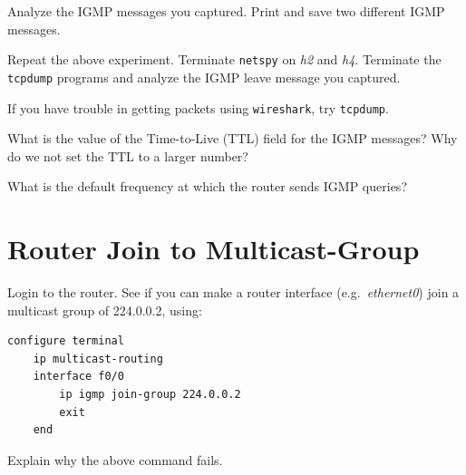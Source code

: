 \documentclass{../UTNetLab}
\begin{document}
    Analyze the IGMP messages you captured.
    Print and save two different IGMP messages.

    Repeat the above experiment.
    Terminate \lstinline{netspy} on \textit{h2} and \textit{h4}.
    Terminate the \lstinline{tcpdump} programs and analyze the IGMP leave message you captured.

    If you have trouble in getting packets using \lstinline{wireshark}, try \lstinline{tcpdump}.
    
    \begin{report}
    \item What is the value of the Time-to-Live (TTL) field for the IGMP messages?
    Why do we not set the TTL to a larger number?

    \item What is the default frequency at which the router sends IGMP queries?
    \end{report}

\section{Router Join to Multicast-Group}
    Login to the router.
    See if you can make a router interface (e.g.\ \textit{ethernet0}) join a multicast group of 224.0.0.2, using:
    \begin{lstlisting}[language={cisco}]
configure terminal
    ip multicast-routing
    interface f0/0
        ip igmp join-group 224.0.0.2
        exit
    end
    \end{lstlisting}
    
    \begin{report}
    \item Explain why the above command fails.
    \end{report}
\end{document}
